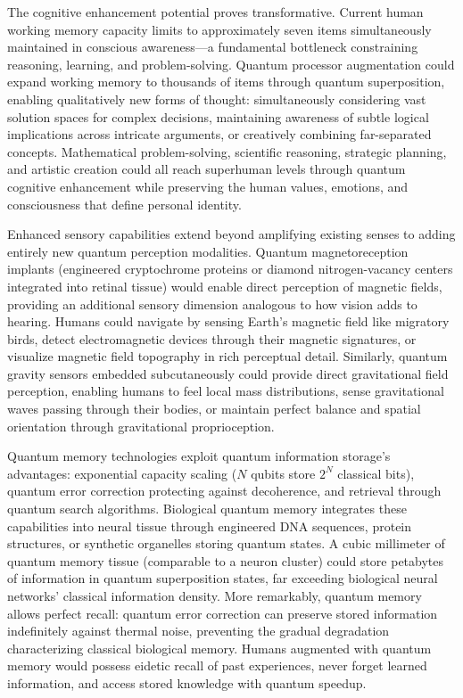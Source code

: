 \documentclass[11pt,a4paper,twoside]{article}
\begin{document}
The cognitive enhancement potential proves transformative. Current human working memory capacity limits to approximately seven items simultaneously maintained in conscious awareness---a fundamental bottleneck constraining reasoning, learning, and problem-solving. Quantum processor augmentation could expand working memory to thousands of items through quantum superposition, enabling qualitatively new forms of thought: simultaneously considering vast solution spaces for complex decisions, maintaining awareness of subtle logical implications across intricate arguments, or creatively combining far-separated concepts. Mathematical problem-solving, scientific reasoning, strategic planning, and artistic creation could all reach superhuman levels through quantum cognitive enhancement while preserving the human values, emotions, and consciousness that define personal identity.

Enhanced sensory capabilities extend beyond amplifying existing senses to adding entirely new quantum perception modalities. Quantum magnetoreception implants (engineered cryptochrome proteins or diamond nitrogen-vacancy centers integrated into retinal tissue) would enable direct perception of magnetic fields, providing an additional sensory dimension analogous to how vision adds to hearing. Humans could navigate by sensing Earth's magnetic field like migratory birds, detect electromagnetic devices through their magnetic signatures, or visualize magnetic field topography in rich perceptual detail. Similarly, quantum gravity sensors embedded subcutaneously could provide direct gravitational field perception, enabling humans to feel local mass distributions, sense gravitational waves passing through their bodies, or maintain perfect balance and spatial orientation through gravitational proprioception.

Quantum memory technologies exploit quantum information storage's advantages: exponential capacity scaling ($N$ qubits store $2^N$ classical bits), quantum error correction protecting against decoherence, and retrieval through quantum search algorithms. Biological quantum memory integrates these capabilities into neural tissue through engineered DNA sequences, protein structures, or synthetic organelles storing quantum states. A cubic millimeter of quantum memory tissue (comparable to a neuron cluster) could store petabytes of information in quantum superposition states, far exceeding biological neural networks' classical information density. More remarkably, quantum memory allows perfect recall: quantum error correction can preserve stored information indefinitely against thermal noise, preventing the gradual degradation characterizing classical biological memory. Humans augmented with quantum memory would possess eidetic recall of past experiences, never forget learned information, and access stored knowledge with quantum speedup.
\end{document}
